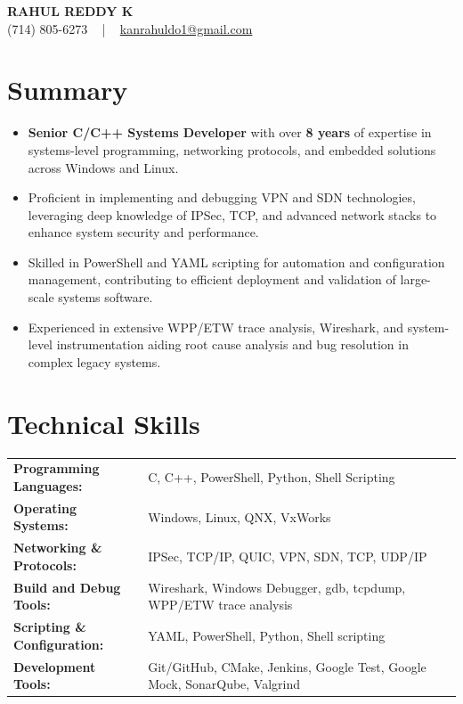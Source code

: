 \documentclass[letterpaper,11pt]{article}
\newcommand{\resumeItem}[1]{
  \item\footnotesize{
    {#1 \vspace{-2pt}}
  }
}
\newcommand{\resumeItemListStart}{\begin{itemize}[leftmargin=*]}
\newcommand{\resumeItemListEnd}{\end{itemize}\vspace{-5pt}}
\begin{document}
\begin{center}
    {\fontsize{14pt}{12pt}\selectfont \textbf{\MakeUppercase{Rahul Reddy K}}}\\ \vspace{2pt}
    \fontsize{10pt}{12pt}\selectfont (714) 805-6273 ~ | ~ \href{mailto:kanrahuldo1@gmail.com}{kanrahuldo1@gmail.com}~
    \vspace{-8pt}
\end{center}

\section{Summary}
\fontsize{9pt}{10pt}\selectfont
\resumeItemListStart
    \resumeItem{\textbf{Senior C/C++ Systems Developer} with over \textbf{8 years} of expertise in systems-level programming, networking protocols, and embedded solutions across Windows and Linux.} \vspace{-3pt}
    \resumeItem{Proficient in implementing and debugging VPN and SDN technologies, leveraging deep knowledge of IPSec, TCP, and advanced network stacks to enhance system security and performance.} \vspace{-3pt}
    \resumeItem{Skilled in PowerShell and YAML scripting for automation and configuration management, contributing to efficient deployment and validation of large-scale systems software.} \vspace{-3pt}
    \resumeItem{Experienced in extensive WPP/ETW trace analysis, Wireshark, and system-level instrumentation aiding root cause analysis and bug resolution in complex legacy systems.} \vspace{-3pt}
\resumeItemListEnd
\vspace{-6pt}

\section{Technical Skills}
        \vspace{-14pt}
        \begin{table}[h]
            \fontsize{9pt}{10pt}\selectfont
            \begin{tabular}{p{0.3\linewidth} p{0.7\linewidth}}
                \textbf{Programming Languages:} & C, C++, PowerShell, Python, Shell Scripting \\
                \textbf{Operating Systems:} & Windows, Linux, QNX, VxWorks \\
                \textbf{Networking \& Protocols:} & IPSec, TCP/IP, QUIC, VPN, SDN, TCP, UDP/IP \\
                \textbf{Build and Debug Tools:} & Wireshark, Windows Debugger, gdb, tcpdump, WPP/ETW trace analysis \\
                \textbf{Scripting \& Configuration:} & YAML, PowerShell, Python, Shell scripting \\
                \textbf{Development Tools:} & Git/GitHub, CMake, Jenkins, Google Test, Google Mock, SonarQube, Valgrind \\
            \end{tabular}
        \end{table}
    \vspace{-15pt}
\end{document}
